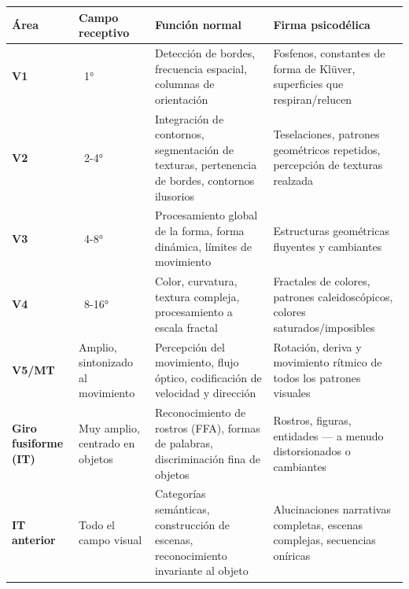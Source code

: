 \documentclass[11pt, twoside, openright]{book}
\begin{document}
\small
\begin{xltabular}{\linewidth}{X X X X}
\toprule
\textbf{Área} & \textbf{Campo receptivo} & \textbf{Función normal} & \textbf{Firma psicodélica} \\
\midrule\endhead
\textbf{V1} & ~1° & Detección de bordes, frecuencia espacial, columnas de orientación & Fosfenos, constantes de forma de Klüver, superficies que respiran/\allowbreak{}relucen \\[4pt]
\textbf{V2} & ~2-4° & Integración de contornos, segmentación de texturas, pertenencia de bordes, contornos ilusorios & Teselaciones, patrones geométricos repetidos, percepción de texturas realzada \\[4pt]
\textbf{V3} & ~4-8° & Procesamiento global de la forma, forma dinámica, límites de movimiento & Estructuras geométricas fluyentes y cambiantes \\[4pt]
\textbf{V4} & ~8-16° & Color, curvatura, textura compleja, procesamiento a escala fractal & Fractales de colores, patrones caleidoscópicos, colores saturados/\allowbreak{}imposibles \\[4pt]
\textbf{V5/\allowbreak{}MT} & Amplio, sintonizado al movimiento & Percepción del movimiento, flujo óptico, codificación de velocidad y dirección & Rotación, deriva y movimiento rítmico de todos los patrones visuales \\[4pt]
\textbf{Giro fusiforme (IT)} & Muy amplio, centrado en objetos & Reconocimiento de rostros (FFA), formas de palabras, discriminación fina de objetos & Rostros, figuras, entidades --- a menudo distorsionados o cambiantes \\[4pt]
\textbf{IT anterior} & Todo el campo visual & Categorías semánticas, construcción de escenas, reconocimiento invariante al objeto & Alucinaciones narrativas completas, escenas complejas, secuencias oníricas \\[4pt]
\bottomrule
\end{xltabular}
\normalsize
\end{document}
